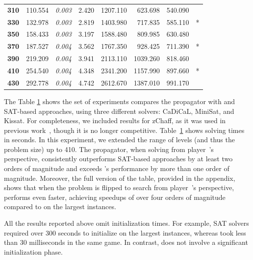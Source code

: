 \documentclass[runningheads]{llncs}
\begin{document}
\begin{table}[ht]
\begin{tabular}{r|r|>{\itshape}r|r|rrrr}
\textbf{310} & 110.554 & 0.003 & \cellcolor{gray!30}2.420 & 1207.110& 623.698 & 540.090 &       \\
\textbf{330} & 132.978 & 0.003 & \cellcolor{gray!30}2.819 & 1403.980& 717.835 & 585.110 & *     \\
\textbf{350} & 158.433 & 0.003 & \cellcolor{gray!30}3.197 & 1588.480& 809.985 & 630.480 &       \\
\textbf{370} & 187.527 & 0.004 & \cellcolor{gray!30}3.562 & 1767.350& 928.425 & 711.390 & *     \\
\textbf{390} & 219.209 & 0.004 & \cellcolor{gray!30}3.941 & 2113.110& 1039.260& 818.460 &       \\
\textbf{410} & 254.540 & 0.004 & \cellcolor{gray!30}4.348 & 2341.200& 1157.990& 897.660 & *     \\
\textbf{430} & 292.778 & 0.004 & \cellcolor{gray!30}4.742 & 2612.670& 1387.010& 991.170 &       \\
\bottomrule
\end{tabular}
\label{tab:jurd-appendix}
\end{table}

The Table \ref{tab:jurd-appendix} shows the set of experiments compares the \noc propagator with \zra and SAT-based approaches, using three different solvers: CaDiCaL, MiniSat, and Kissat. For completeness, we included results for zChaff, as it was used in previous work~\cite{Heljanko:2012}, though it is no longer competitive. Table~\ref{tab:jurd-appendix} shows solving times in seconds. In this experiment, we extended the range of levels (and thus the problem size) up to 410. The \nocmemo propagator, when solving from player~\even’s perspective, consistently outperforms SAT-based approaches by at least two orders of magnitude and exceeds \zra's performance by more than one order of magnitude. Moreover, the full version of the table, provided in the appendix, shows that when the problem is flipped to search from player~\odd’s perspective, \noceager performs even faster, achieving speedups of over four orders of magnitude compared to \zra on the largest instances.

All the results reported above omit initialization times. For example, SAT solvers required over 300 seconds to initialize on the largest instances, whereas \noc took less than 30 milliseconds in the same game. In contrast, \zra does not involve a significant initialization phase.

\newpage
\end{document}
